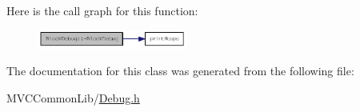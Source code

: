 Here is the call graph for this function:\nopagebreak
\begin{figure}[H]
\begin{center}
\leavevmode
\includegraphics[width=139pt]{class_block_debug_a82a6d59776c3191a56b532ec23f6174e_cgraph}
\end{center}
\end{figure}




The documentation for this class was generated from the following file:\begin{DoxyCompactItemize}
\item 
MVCCommonLib/\hyperlink{_debug_8h}{Debug.h}\end{DoxyCompactItemize}
